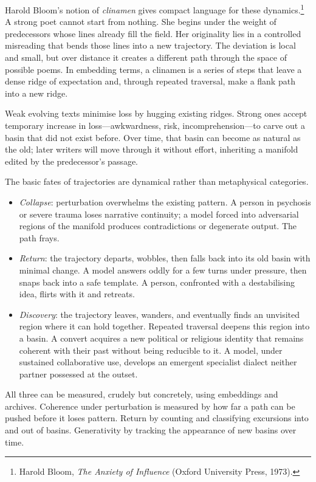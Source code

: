 \documentclass[12pt,a4paper]{article}
\begin{document}
Harold Bloom's notion of \emph{clinamen} gives compact language for these dynamics.\footnote{Harold Bloom, \emph{The Anxiety of Influence} (Oxford University Press, 1973).} A strong poet cannot start from nothing. She begins under the weight of predecessors whose lines already fill the field. Her originality lies in a controlled misreading that bends those lines into a new trajectory. The deviation is local and small, but over distance it creates a different path through the space of possible poems. In embedding terms, a clinamen is a series of steps that leave a dense ridge of expectation and, through repeated traversal, make a flank path into a new ridge.

Weak evolving texts minimise loss by hugging existing ridges. Strong ones accept temporary increase in loss---awkwardness, risk, incomprehension---to carve out a basin that did not exist before. Over time, that basin can become as natural as the old; later writers will move through it without effort, inheriting a manifold edited by the predecessor's passage.

The basic fates of trajectories are dynamical rather than metaphysical categories.

\begin{itemize}
\item \emph{Collapse}: perturbation overwhelms the existing pattern. A person in psychosis or severe trauma loses narrative continuity; a model forced into adversarial regions of the manifold produces contradictions or degenerate output. The path frays.

\item \emph{Return}: the trajectory departs, wobbles, then falls back into its old basin with minimal change. A model answers oddly for a few turns under pressure, then snaps back into a safe template. A person, confronted with a destabilising idea, flirts with it and retreats.

\item \emph{Discovery}: the trajectory leaves, wanders, and eventually finds an unvisited region where it can hold together. Repeated traversal deepens this region into a basin. A convert acquires a new political or religious identity that remains coherent with their past without being reducible to it. A model, under sustained collaborative use, develops an emergent specialist dialect neither partner possessed at the outset.
\end{itemize}

All three can be measured, crudely but concretely, using embeddings and archives. Coherence under perturbation is measured by how far a path can be pushed before it loses pattern. Return by counting and classifying excursions into and out of basins. Generativity by tracking the appearance of new basins over time.
\end{document}
